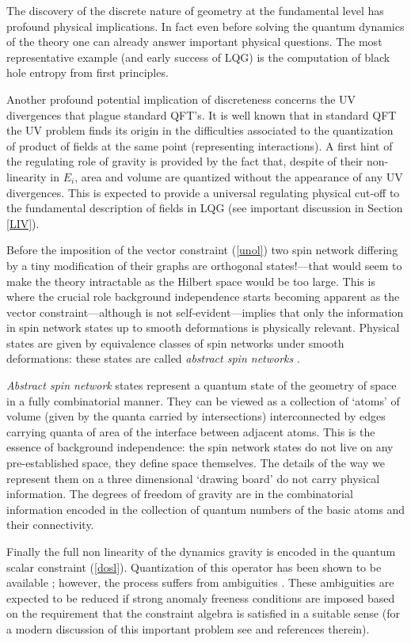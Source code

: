 \documentclass[aps, nofootinbib,superscriptaddress,12pt]{revtex4-2}
\begin{document}
The discovery of the discrete nature of geometry at the
fundamental level has profound physical implications. In fact even
before solving the quantum dynamics of the theory one can already
answer important physical questions. The most representative
example (and early success of LQG) is the computation of black
hole entropy from first principles.

Another profound potential implication of discreteness concerns the UV
divergences that plague standard QFT's. It is well known that in
standard QFT the UV problem finds its origin in the difficulties
associated to the quantization of product of fields at the same
point (representing interactions). A first hint of the regulating
role of gravity is provided by the fact that, despite of their
non-linearity in $E_i$, area and volume are quantized without
the appearance of any UV divergences. This is  
expected to provide a universal regulating physical cut-off to the fundamental 
description of fields in LQG (see important discussion in Section \ref{LIV}).

Before the imposition of the vector constraint (\ref{unol}) two spin network differing by a tiny
modification of their graphs are orthogonal states!---that would
seem to make the theory intractable as the Hilbert space would be too large. This is where the
crucial role background independence starts becoming apparent as
the vector constraint---although is not self-evident---implies
that only the information in spin network states up to smooth
deformations is physically relevant. Physical states are given by equivalence classes
of spin networks under smooth deformations: these states are
called {\em abstract spin networks} \cite{Ashtekar:1994mh, Ashtekar:1994wa}.

{\em Abstract spin network} states represent a quantum state of
the geometry of space in a fully combinatorial manner. They can be
viewed as a collection of `atoms' of volume (given by the quanta
carried by intersections) interconnected by edges carrying quanta
of area of the interface between adjacent atoms. This is the
essence of background independence: the spin network states do not
live on any pre-established space, they define space themselves.
The details of the way we represent them on a three dimensional
`drawing board' do not carry physical information. The degrees of
freedom of gravity are in the combinatorial information encoded in
the collection of quantum numbers of the basic atoms and their
connectivity.

Finally the full non linearity of the dynamics gravity is encoded in the quantum scalar constraint (\ref{dosl}).
Quantization of this operator has been shown to be available \cite{Thiemann:1996aw, Thiemann:1997rv}; however, the process suffers from ambiguities \cite{Perez:2005fn}. 
These ambiguities are expected to be reduced if strong anomaly freeness conditions are imposed based on the 
requirement that the constraint algebra is satisfied in a suitable sense (for a modern discussion of this important problem see \cite{Laddha:book} and references therein). 
\end{document}
